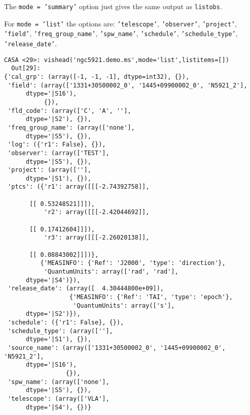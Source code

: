 The {\tt mode = 'summary'} option just gives the same output as
{\tt listobs}.

For {\tt mode = 'list'} the options are: {\tt 'telescope'}, 
{\tt 'observer'}, {\tt 'project'}, {\tt 'field'}, {\tt 'freq\_group\_name'},
{\tt 'spw\_name'}, {\tt 'schedule'}, {\tt 'schedule\_type'}, 
{\tt 'release\_date'}. 

\small
\begin{verbatim}
CASA <29>: vishead('ngc5921.demo.ms',mode='list',listitems=[])
  Out[29]: 
{'cal_grp': (array([-1, -1, -1], dtype=int32), {}),
 'field': (array(['1331+30500002_0', '1445+09900002_0', 'N5921_2'], 
      dtype='|S16'),
           {}),
 'fld_code': (array(['C', 'A', ''], 
      dtype='|S2'), {}),
 'freq_group_name': (array(['none'], 
      dtype='|S5'), {}),
 'log': ({'r1': False}, {}),
 'observer': (array(['TEST'], 
      dtype='|S5'), {}),
 'project': (array([''], 
      dtype='|S1'), {}),
 'ptcs': ({'r1': array([[[-2.74392758]],

       [[ 0.53248521]]]),
           'r2': array([[[-2.42044692]],

       [[ 0.17412604]]]),
           'r3': array([[[-2.26020138]],

       [[ 0.08843002]]])},
          {'MEASINFO': {'Ref': 'J2000', 'type': 'direction'},
           'QuantumUnits': array(['rad', 'rad'], 
      dtype='|S4')}),
 'release_date': (array([  4.30444800e+09]),
                  {'MEASINFO': {'Ref': 'TAI', 'type': 'epoch'},
                   'QuantumUnits': array(['s'], 
      dtype='|S2')}),
 'schedule': ({'r1': False}, {}),
 'schedule_type': (array([''], 
      dtype='|S1'), {}),
 'source_name': (array(['1331+30500002_0', '1445+09900002_0', 'N5921_2'], 
      dtype='|S16'),
                 {}),
 'spw_name': (array(['none'], 
      dtype='|S5'), {}),
 'telescope': (array(['VLA'], 
      dtype='|S4'), {})}
\end{verbatim}
\normalsize

